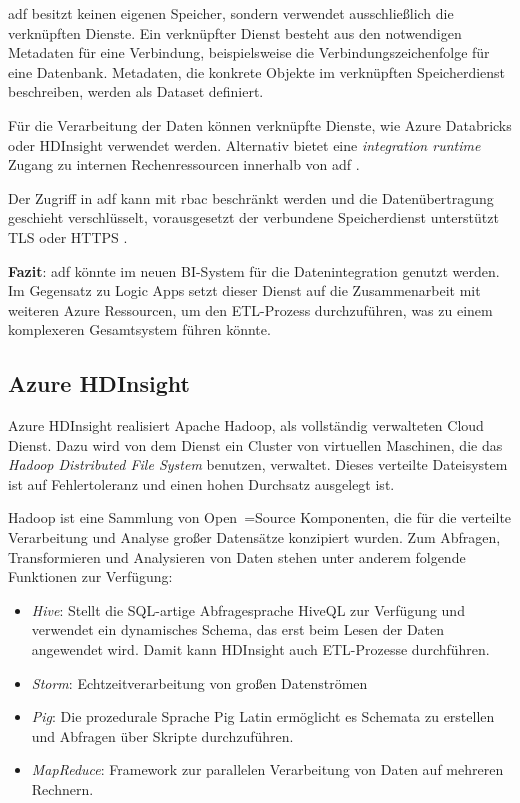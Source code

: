 \ac{adf} besitzt keinen eigenen Speicher, sondern verwendet ausschließlich die verknüpften Dienste. Ein verknüpfter Dienst besteht aus den notwendigen Metadaten für eine Verbindung, beispielsweise die Verbindungszeichenfolge für eine Datenbank. Metadaten, die konkrete Objekte im verknüpften Speicherdienst beschreiben, werden als Dataset definiert. 

Für die Verarbeitung der Daten können verknüpfte Dienste, wie Azure Databricks oder HDInsight verwendet werden. Alternativ bietet eine \textit{integration runtime} Zugang zu internen Rechenressourcen innerhalb von \ac{adf} \cite{swinbank_your_2021}.

Der Zugriff in \ac{adf} kann mit \ac{rbac} beschränkt werden \cite{sabat_security_2021} und die Datenübertragung geschieht verschlüsselt, vorausgesetzt der verbundene Speicherdienst unterstützt TLS oder HTTPS \cite{baldwin_azure_adf_2021}.

\textbf{Fazit}: \ac{adf} könnte im neuen BI-System für die Datenintegration genutzt werden. Im Gegensatz zu Logic Apps setzt dieser Dienst auf die Zusammenarbeit mit weiteren Azure Ressourcen, um den ETL-Prozess durchzuführen, was zu einem komplexeren Gesamtsystem führen könnte.


\subsection{Azure HDInsight} \label{sec:grundlagen:azure_dienste:hdInsight}
Azure HDInsight realisiert Apache Hadoop, als vollständig verwalteten Cloud Dienst. Dazu wird von dem Dienst ein Cluster von virtuellen Maschinen, die das \textit{Hadoop Distributed File System} benutzen, verwaltet. Dieses verteilte Dateisystem ist auf Fehlertoleranz und einen hohen Durchsatz ausgelegt ist.

Hadoop ist eine Sammlung von Open~=Source Komponenten, die für die verteilte Verarbeitung und Analyse großer Datensätze konzipiert wurden. Zum Abfragen, Transformieren und Analysieren von Daten stehen unter anderem folgende Funktionen zur Verfügung:
\begin{itemize}
\item \textit{Hive}: Stellt die SQL-artige Abfragesprache HiveQL zur Verfügung und verwendet ein dynamisches Schema, das erst beim Lesen der Daten angewendet wird. Damit kann HDInsight auch ETL-Prozesse durchführen.
\item \textit{Storm}: Echtzeitverarbeitung von großen Datenströmen 
\item \textit{Pig}: Die prozedurale Sprache Pig Latin ermöglicht es Schemata zu erstellen und Abfragen über Skripte durchzuführen.
\item \textit{MapReduce}: Framework zur parallelen Verarbeitung von Daten auf mehreren Rechnern.
\end{itemize}

